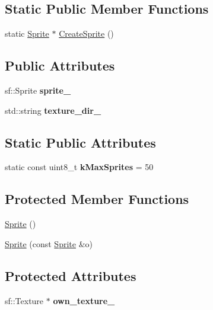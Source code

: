 \subsection*{Static Public Member Functions}
\begin{DoxyCompactItemize}
\item 
static \hyperlink{class_sprite}{Sprite} $\ast$ \hyperlink{class_sprite_aaabea785dc01ff0246b290fc9e6b3f62}{Create\+Sprite} ()
\end{DoxyCompactItemize}
\subsection*{Public Attributes}
\begin{DoxyCompactItemize}
\item 
\mbox{\label{class_sprite_abf366a9a6edad58a8e2bb8a61cc2c3cd}} 
sf\+::\+Sprite {\bfseries sprite\+\_\+}
\item 
\mbox{\label{class_sprite_a06bd345188635cf4ecd14c0388458f87}} 
std\+::string {\bfseries texture\+\_\+dir\+\_\+}
\end{DoxyCompactItemize}
\subsection*{Static Public Attributes}
\begin{DoxyCompactItemize}
\item 
\mbox{\label{class_sprite_a9f565e1571739b17c22760fa99289d2a}} 
static const uint8\+\_\+t {\bfseries k\+Max\+Sprites} = 50
\end{DoxyCompactItemize}
\subsection*{Protected Member Functions}
\begin{DoxyCompactItemize}
\item 
\hyperlink{class_sprite_a12cba3ac1868418add3c4d95ce87e615}{Sprite} ()
\item 
\hyperlink{class_sprite_aa5cb9fac0cfa5d81dc429e75137179d0}{Sprite} (const \hyperlink{class_sprite}{Sprite} \&o)
\end{DoxyCompactItemize}
\subsection*{Protected Attributes}
\begin{DoxyCompactItemize}
\item 
\mbox{\label{class_sprite_adc21e288d7f99213c4b0ef37eaa58353}} 
sf\+::\+Texture $\ast$ {\bfseries own\+\_\+texture\+\_\+}
\end{DoxyCompactItemize}
